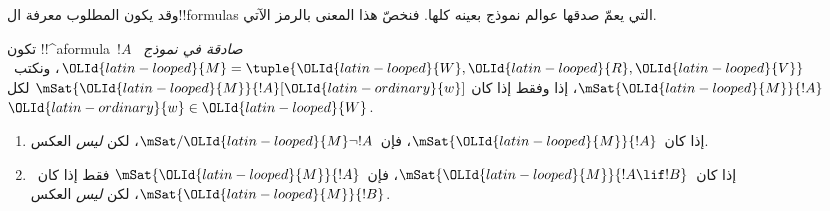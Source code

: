 \documentclass[../../../include/open-logic-section]{subfiles}
\begin{document}


وقد يكون المطلوب معرفة ال!!{formula}s التي يعمّ صدقها عوالم نموذج
بعينه كلها. فنخصّ هذا المعنى بالرمز الآتي.

\begin{defn}
  تكون !!^a{formula}~$!A$ \emph{صادقة في نموذج}~$\OLId{latin-looped}{M} = \tuple{\OLId{latin-looped}{W}, \OLId{latin-looped}{R},
    \OLId{latin-looped}{V}}$، ونكتب~$\mSat{\OLId{latin-looped}{M}}{!A}$، إذا وفقط إذا كان
  $\mSat{\OLId{latin-looped}{M}}{!A}[\OLId{latin-ordinary}{w}]$ لكل~$\OLId{latin-ordinary}{w} \in \OLId{latin-looped}{W}$.
\end{defn}

\begin{prop}
  \begin{enumerate}
  \item إذا كان~$\mSat{\OLId{latin-looped}{M}}{!A}$، فإن~$\mSat/{\OLId{latin-looped}{M}}{\lnot !A}$، لكن
    \emph{ليس} العكس.
  \item إذا كان~$\mSat{\OLId{latin-looped}{M}}{!A \lif !B}$، فإن~$\mSat{\OLId{latin-looped}{M}}{!A}$ فقط إذا
    كان~$\mSat{\OLId{latin-looped}{M}}{!B}$، لكن \emph{ليس} العكس.
  \end{enumerate}
\end{prop}
\end{document}
